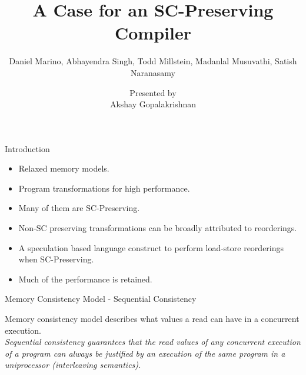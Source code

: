 \documentclass{beamer}
\title{A Case for an SC-Preserving Compiler}
\subtitle{Daniel Marino, Abhayendra Singh, Todd Millstein, Madanlal Musuvathi, Satish Naranasamy}
\author{Presented by \\ Akshay Gopalakrishnan}
\institute{McGill University}
\begin{document}
    
    \begin{frame}

        \titlepage
    
    \end{frame}

    \begin{frame}{Introduction}

        \begin{itemize}
            \item Relaxed memory models.
            \item Program transformations for high performance.
            \item Many of them are SC-Preserving.
            \item Non-SC preserving transformations can be broadly attributed to reorderings.
            \item A speculation based language construct to perform load-store reorderings when SC-Preserving. 
            \item Much of the performance is retained. 
        \end{itemize}

    \end{frame}


    \begin{frame}{Memory Consistency Model - Sequential Consistency}

        Memory consistency model describes what values a read can have in a concurrent execution.
        \\        
        \center \textit{Sequential consistency guarantees that the read values of any concurrent execution of a program can always be justified by an execution of the same program in a uniprocessor (interleaving semantics).} 

    \end{frame}
\end{document}
